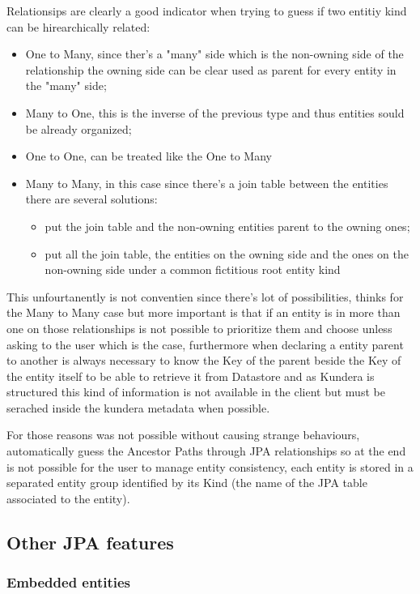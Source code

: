 Relationsips are clearly a good indicator when trying to guess if two entitiy kind can be hirearchically related:
\begin{itemize}
\item One to Many, since ther's a "many" side which is the non-owning side of the relationship the owning side can be clear used as parent for every entity in the "many" side;
\item Many to One, this is the inverse of the previous type and thus entities sould be already organized;
\item One to One, can be treated like the One to Many
\item Many to Many, in this case since there's a join table between the entities there are several solutions:
\begin{itemize}
\item put the join table and the non-owning entities parent to the owning ones;
\item put all the join table, the entities on the owning side and the ones on the non-owning side under a common fictitious root entity kind
\end{itemize}
\end{itemize}

This unfourtanently is not conventien since there's lot of possibilities, thinks for the Many to Many case but more important is that if an entity is in more than one on those relationships is not possible to prioritize them and choose unless asking to the user which is the case, furthermore when declaring a entity parent to another is always necessary to know the Key of the parent beside the Key of the entity itself to be able to retrieve it from Datastore and as Kundera is structured this kind of information is not available in the client but must be serached inside the kundera metadata when possible.

For those reasons was not possible without causing strange behaviours, automatically guess the Ancestor Paths through JPA relationships so at the end is not possible for the user to manage entity consistency, each entity is stored in a separated entity group identified by its Kind (the name of the JPA table associated to the entity).

\subsection{Other JPA features}

\subsubsection{Embedded entities}

